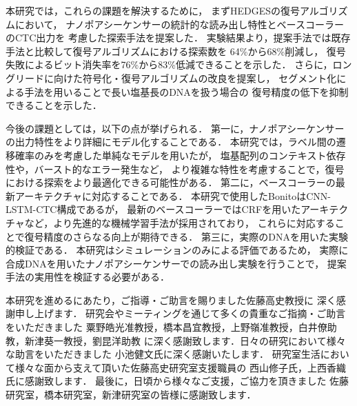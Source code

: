 \documentclass[sotsuron]{kuee}
\begin{document}
本研究では，これらの課題を解決するために，
まずHEDGESの復号アルゴリズムにおいて，
ナノポアシーケンサーの統計的な読み出し特性とベースコーラーのCTC出力を
考慮した探索手法を提案した．
実験結果より，提案手法では既存手法と比較して復号アルゴリズムにおける探索数を
64\%から68\%削減し，
復号失敗によるビット消失率を76\%から83\%低減できることを示した．
さらに，ロングリードに向けた符号化・復号アルゴリズムの改良を提案し，
セグメント化による手法を用いることで長い塩基長のDNAを扱う場合の
復号精度の低下を抑制できることを示した．

今後の課題としては，以下の点が挙げられる．
第一に，ナノポアシーケンサーの出力特性をより詳細にモデル化することである．
本研究では，ラベル間の遷移確率のみを考慮した単純なモデルを用いたが，
塩基配列のコンテキスト依存性や，バースト的なエラー発生など，
より複雑な特性を考慮することで，復号における探索をより最適化できる可能性がある．
第二に，ベースコーラーの最新アーキテクチャに対応することである．
本研究で使用したBonitoはCNN-LSTM-CTC構成であるが，
最新のベースコーラーではCRFを用いたアーキテクチャなど，より先進的な機械学習手法が採用されており，
これらに対応することで復号精度のさらなる向上が期待できる．
第三に，実際のDNAを用いた実験的検証である．
本研究はシミュレーションのみによる評価であるため，
実際に合成DNAを用いたナノポアシーケンサーでの読み出し実験を行うことで，
提案手法の実用性を検証する必要がある．


\begin{acknowledgements}
本研究を進めるにあたり，ご指導・ご助言を賜りました佐藤高史教授に
深く感謝申し上げます．
研究会やミーティングを通じて多くの貴重なご指摘・ご助言をいただきました
粟野皓光准教授，橋本昌宜教授，上野嶺准教授，白井僚助教，新津葵一教授，劉昆洋助教
に深く感謝致します．日々の研究において様々な助言をいただきました
小池健文氏に深く感謝いたします．
研究室生活において様々な面から支えて頂いた佐藤高史研究室支援職員の
西山修子氏，上西香織氏に感謝致します．
最後に，日頃から様々なご支援，ご協力を頂きました
佐藤研究室，橋本研究室，新津研究室の皆様に感謝致します．
\end{acknowledgements}





\end{document}
